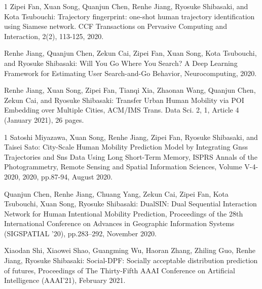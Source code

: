 \begin{雑誌論文}{1}
Zipei Fan, Xuan Song, Quanjun Chen, Renhe Jiang, Ryosuke Shibasaki, and Kota Tsubouchi:  
Trajectory fingerprint: one-shot human trajectory identification using Siamese network. CCF Transactions on Pervasive Computing and Interaction, 2(2), 113-125, 2020.

Renhe Jiang, Quanjun Chen, Zekun Cai, Zipei Fan, Xuan Song, Kota Tsubouchi, and Ryosuke Shibasaki: 
Will You Go Where You Search? A Deep Learning Framework for Estimating User Search-and-Go Behavior, Neurocomputing, 2020.

Renhe Jiang, Xuan Song, Zipei Fan, Tianqi Xia, Zhaonan Wang, Quanjun Chen, Zekun Cai, and Ryosuke Shibasaki: 
Transfer Urban Human Mobility via POI Embedding over Multiple Cities, ACM/IMS Trans. Data Sci. 2, 1, Article 4 (January 2021), 26 pages.
\end{雑誌論文}

\begin{査読付}{1}
Satoshi Miyazawa, Xuan Song, Renhe Jiang, Zipei Fan, Ryosuke Shibasaki, and Taisei Sato:
City-Scale Human Mobility Prediction Model by Integrating Gnss Trajectories and Sns Data Using Long Short-Term Memory, ISPRS Annals of the Photogrammetry, Remote Sensing and Spatial Information Sciences, Volume V-4-2020, 2020, pp.87-94, August 2020.

Quanjun Chen, Renhe Jiang, Chuang Yang, Zekun Cai, Zipei Fan, Kota Tsubouchi, Xuan Song, Ryosuke Shibasaki: 
DualSIN: Dual Sequential Interaction Network for Human Intentional Mobility Prediction, Proceedings of the 28th International Conference on Advances in Geographic Information Systems (SIGSPATIAL '20), pp.283–292, November 2020.

Xiaodan Shi, Xiaowei Shao, Guangming Wu, Haoran Zhang, Zhiling Guo, Renhe Jiang, Ryosuke Shibasaki: 
Social-DPF: Socially acceptable distribution prediction of futures, Proceedings of The Thirty-Fifth AAAI Conference on Artificial Intelligence (AAAI'21), February 2021.
\end{査読付}



